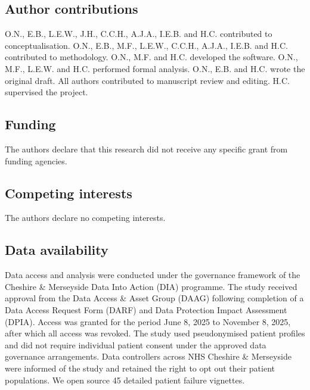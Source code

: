 
\subsection{Author contributions}
O.N., E.B., L.E.W., J.H., C.C.H., A.J.A., I.E.B. and H.C. contributed to conceptualisation. O.N., E.B., M.F., L.E.W., C.C.H., A.J.A., I.E.B. and H.C. contributed to methodology. O.N., M.F. and H.C. developed the software. O.N., M.F., L.E.W. and H.C. performed formal analysis. O.N., E.B. and H.C. wrote the original draft. All authors contributed to manuscript review and editing. H.C. supervised the project.

\subsection{Funding}
The authors declare that this research did not receive any specific grant from funding agencies.

\subsection{Competing interests}
The authors declare no competing interests.

\subsection{Data availability}
Data access and analysis were conducted under the governance framework of the Cheshire \& Merseyside Data Into Action (DIA) programme. The study received approval from the Data Access \& Asset Group (DAAG) following completion of a Data Access Request Form (DARF) and Data Protection Impact Assessment (DPIA). Access was granted for the period June 8, 2025 to November 8, 2025, after which all access was revoked. The study used pseudonymised patient profiles and did not require individual patient consent under the approved data governance arrangements. Data controllers across NHS Cheshire \& Merseyside were informed of the study and retained the right to opt out their patient populations. We open source 45 detailed patient failure vignettes.